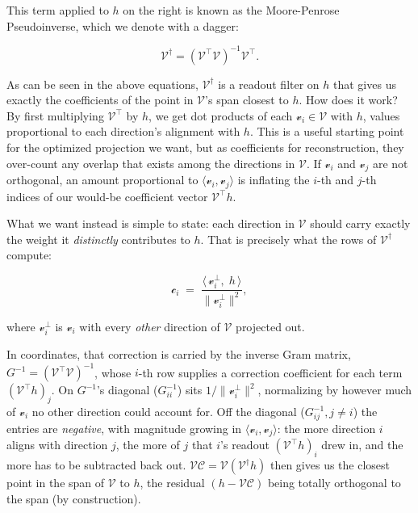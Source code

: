 \documentclass{article}
\begin{document}
This term applied to \(h\) on the right is known as the Moore-Penrose Pseudoinverse, which we denote with a dagger:

\[\mathscr{V}^\dagger = (\mathscr{V}^\top\mathscr{V})^{-1}\mathscr{V}^\top.\]

As can be seen in the above equations, \(\mathscr{V}^\dagger\) is a readout filter on \(h\) that gives us exactly the coefficients of the point in \(\mathscr{V}\)'s span closest to \(h\). How does it work? By first multiplying \(\mathscr{V}^\top\) by \(h\), we get dot products of each \(\mathscr{v}_i \in \mathscr{V}\) with \(h\), values proportional to each direction's alignment with \(h\). This is a useful starting point for the optimized projection we want, but as coefficients for reconstruction, they over-count any overlap that exists among the directions in \(\mathscr{V}\). If \(\mathscr{v}_i\) and \(\mathscr{v}_j\) are not orthogonal, an amount proportional to \(\langle\mathscr{v}_i, \mathscr{v}_j\rangle\) is inflating the \(i\)-th and \(j\)-th indices of our would-be coefficient vector \(\mathscr{V}^\top h\).

What we want instead is simple to state: each direction in \(\mathscr{V}\) should carry exactly the weight it \textit{distinctly} contributes to \(h\). That is precisely what the rows of \(\mathscr{V}^\dagger\) compute:

\[\mathscr{c}_i \;=\; \frac{\langle\, \mathscr{v}_i^\perp,\; h \,\rangle}{\lVert \mathscr{v}_i^\perp \rVert^2},\]

where \(\mathscr{v}_i^\perp\) is \(\mathscr{v}_i\) with every \textit{other} direction of \(\mathscr{V}\) projected out.

In coordinates, that correction is carried by the inverse Gram matrix, \(G^{-1} = (\mathscr{V}^\top\mathscr{V})^{-1}\), whose \(i\)-th row supplies a correction coefficient for each term \((\mathscr{V}^\top h)_j\). On \(G^{-1}\)'s diagonal (\(G^{-1}_{ii}\)) sits \(1/\lVert\mathscr{v}_i^\perp\rVert^2\), normalizing by however much of \(\mathscr{v}_i\) no other direction could account for. Off the diagonal (\(G^{-1}_{ij}, j \neq i\)) the entries are \textit{negative}, with magnitude growing in \(\langle\mathscr{v}_i, \mathscr{v}_j\rangle\): the more direction \(i\) aligns with direction \(j\), the more of \(j\) that \(i\)'s readout \((\mathscr{V}^\top h)_i\) drew in, and the more has to be subtracted back out. \(\mathscr{V}\mathscr{C} = \mathscr{V}(\mathscr{V}^\dagger h)\) then gives us the closest point in the span of \(\mathscr{V}\) to \(h\), the residual \((h - \mathscr{V}\mathscr{C})\) being totally orthogonal to the span (by construction).
\end{document}
